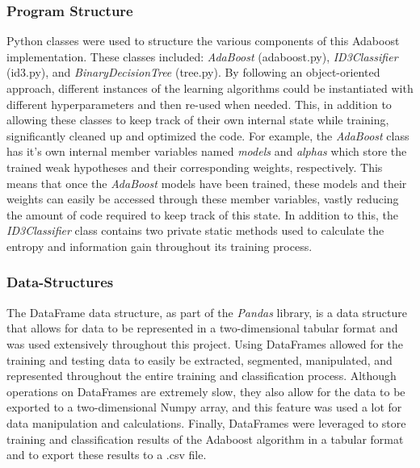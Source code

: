 \documentclass[a4paper]{article}
\begin{document}
\subsubsection{Program Structure}
Python classes were used to structure the various components of this Adaboost implementation. These classes included: \textit{AdaBoost} (adaboost.py), \textit{ID3Classifier} (id3.py), and \textit{BinaryDecisionTree} (tree.py). By following an object-oriented approach, different instances of the learning algorithms could be instantiated with different hyperparameters and then re-used when needed. This, in addition to allowing these classes to keep track of their own internal state while training, significantly cleaned up and optimized the code. For example, the \textit{AdaBoost} class has it's own internal member variables named \textit{models} and \textit{alphas} which store the trained weak hypotheses and their corresponding weights, respectively. This means that once the \textit{AdaBoost} models have been trained, these models and their weights can easily be accessed through these member variables, vastly reducing the amount of code required to keep track of this state. In addition to this, the \textit{ID3Classifier} class contains two private static methods used to calculate the entropy and information gain throughout its training process.

\subsubsection{Data-Structures}
The DataFrame data structure, as part of the \textit{Pandas} library, is a data structure that allows for data to be represented in a two-dimensional tabular format and was used extensively throughout this project. Using DataFrames allowed for the training and testing data to easily be extracted, segmented, manipulated, and represented throughout the entire training and classification process. Although operations on DataFrames are extremely slow, they also allow for the data to be exported to a two-dimensional Numpy array, and this feature was used a lot for data manipulation and calculations. Finally, DataFrames were leveraged to store training and classification results of the Adaboost algorithm in a tabular format and to export these results to a .csv file.
\end{document}
